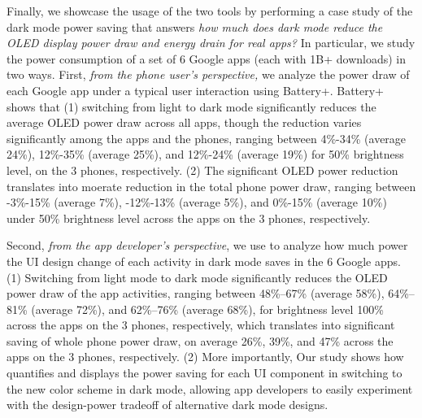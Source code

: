 
Finally, 
we showcase the usage of the two tools by performing a case study of the dark mode
power saving that answers {\em how much does dark mode reduce the
  OLED display power draw and energy drain for real apps?}  In
particular, we study the power consumption of a set of 6
 Google apps {(each with 1B+ downloads)} in two ways.  First, {\em from the phone user's
  perspective,} we analyze the power draw of each Google app under a
typical user interaction using Battery+.
Battery+ shows that (1) switching from light to dark mode
significantly reduces the average OLED power draw across all apps,
though the reduction varies significantly among the apps and the phones, ranging
between 4\%-34\% (average 24\%), 12\%-35\% (average 25\%), and
12\%-24\% (average 19\%) for 50\% brightness level,
on the 3 phones, respectively.  (2) The significant OLED power reduction
translates into moerate reduction in the total phone power draw, ranging between
-3\%-15\% (average 7\%),
-12\%-13\% (average 5\%),
and 0\%-15\% (average 10\%) under 50\% brightness level
across the apps on the 3 phones, respectively.

Second, {\em from the app developer's perspective}, we use \name to analyze how
much power the UI design change of each activity in dark mode saves in
the 6 Google apps.
(1) Switching from light mode to dark mode significantly reduces the OLED power
draw of the app activities, ranging between 48\%--67\% (average 58\%),
64\%--81\% (average 72\%), and 62\%--76\% (average 68\%),
for brightness level 100\% across the apps on the 3 phones, respectively,
which translates into significant saving of whole phone power draw,
on average 26\%, 39\%, and 47\% across the apps on the 3 phones, respectively.
(2) More importantly,
\fi
Our study shows how
\name quantifies and displays the power saving for each UI component
in switching to the new color scheme in dark mode, allowing app developers
to easily experiment with the design-power tradeoff of
alternative dark mode designs.

